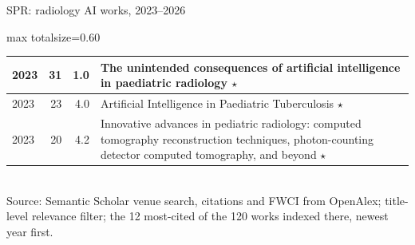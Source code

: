 \documentclass[aspectratio=169]{beamer}
\begin{document}
\begin{frame}[category=Conferences]{SPR: radiology AI works, 2023--2026}
\begin{adjustbox}{max totalsize={\textwidth}{0.60\textheight}}
\begin{tabular}{|l|r|r|>{\raggedright\arraybackslash}p{}|}
2023 & 31 & 1.0 & The unintended consequences of artificial intelligence in paediatric radiology $\star$ \\ \hline
2023 & 23 & 4.0 & Artificial Intelligence in Paediatric Tuberculosis $\star$ \\ \hline
2023 & 20 & 4.2 & Innovative advances in pediatric radiology: computed tomography reconstruction techniques, photon-counting detector computed tomography, and beyond $\star$ \\ \hline
\end{tabular}
\end{adjustbox}
\\[2pt]
{\tiny Source: Semantic Scholar venue search, citations and FWCI from OpenAlex; title-level relevance filter; the 12 most-cited of the 120 works indexed there, newest year first.}
\end{frame}
\end{document}
